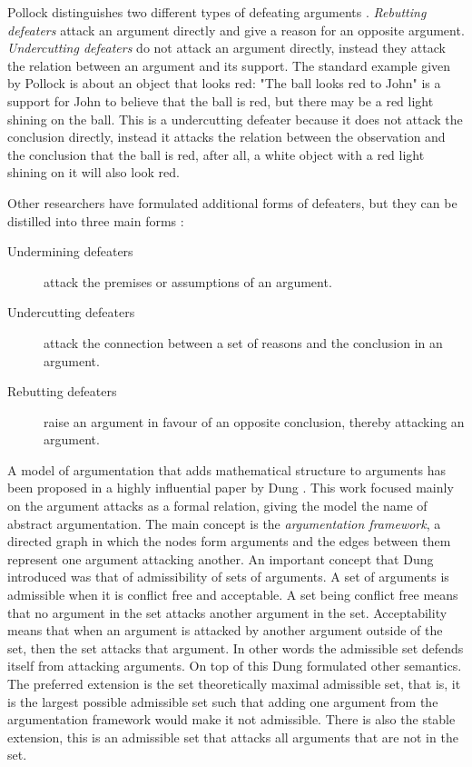 Pollock distinguishes two different types of defeating arguments
\cite{pollock1995}. \emph{Rebutting defeaters} attack an argument directly and
give a reason for an opposite argument. \emph{Undercutting defeaters} do not
attack an argument directly, instead they attack the relation between an
argument and its support. The standard example given by Pollock is about an
object that looks red: "The ball looks red to John" is a support for John to
believe that the ball is red, but there may be a red light shining on the ball.
This is a undercutting defeater because it does not attack the conclusion
directly, instead it attacks the relation between the observation and the
conclusion that the ball is red, after all, a white object with a red light
shining on it will also look red.

Other researchers have formulated additional forms of defeaters, but they can
be distilled into three main forms \cite{vaneemeren2014}:
\begin{description}
	\item[Undermining defeaters] attack the premises or assumptions of an
	argument.
	\item[Undercutting defeaters] attack the connection between a set of
	reasons and the conclusion in an argument.
	\item[Rebutting defeaters] raise an argument in favour of an opposite
	conclusion, thereby attacking an argument.
\end{description}

A model of argumentation that adds mathematical structure to arguments has been
proposed in a highly influential paper by Dung \cite{dung1995}.
This work focused mainly on the argument attacks as a formal relation, giving
the model the name of abstract argumentation. The main concept is the
\emph{argumentation framework}, a directed graph in which the nodes form
arguments and the edges between them represent one argument attacking another.
An important concept that Dung introduced was that of admissibility of sets of
arguments. A set of arguments is admissible when it is conflict free and
acceptable. A set being conflict free means that no argument in the set attacks
another argument in the set. Acceptability means that when an argument is
attacked by another argument outside of the set, then the set attacks that
argument. In other words the admissible set defends itself from attacking
arguments. On top of this Dung formulated other semantics. The preferred
extension is the set theoretically maximal admissible set, that is, it is the
largest possible admissible set such that adding one argument from the
argumentation framework would make it not admissible. There is also the stable
extension, this is an admissible set that attacks all arguments that are not in
the set.

